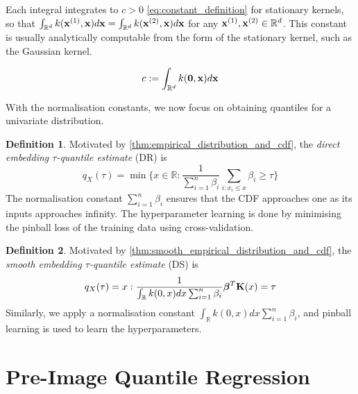 \documentclass[twoside]{article} \usepackage{aistats2017}
\theoremstyle{definition}
\newtheorem{definition}{Definition}[section]
\theoremstyle{theorem}
\newcommand{\rv}[1]{{#1}}
\begin{document}
		Each integral integrates to $c > 0$ \eqref{eq:constant_definition} for stationary kernels, so that $\int_{\mathbb{R}^{d}} k(\mathbf{x}^{(1)}, \mathbf{x}) d\mathbf{x} = \int_{\mathbb{R}^{d}} k(\mathbf{x}^{(2)}, \mathbf{x}) d\mathbf{x}$ for any $\mathbf{x}^{(1)}, \mathbf{x}^{(2)} \in \mathbb{R}^{d}$. This constant is usually analytically computable from the form of the stationary kernel, such as the Gaussian kernel.
		
		\begin{equation}
			c := \int_{\mathbb{R}^{d}} k(\mathbf{0}, \mathbf{x}) d\mathbf{x}
		\label{eq:constant_definition}
		\end{equation}
		
		With the normalisation constants, we now focus on obtaining quantiles for a univariate distribution.

		\theoremstyle{definition}
		\begin{definition}
			Motivated by \cref{thm:empirical_distribution_and_cdf}, the \textit{direct embedding $\tau$-quantile estimate} (DR) is
			\begin{equation}
			q_{\rv{X}}(\tau) = \min\{x \in \mathbb{R} : \frac{1}{\sum_{i = 1}^{n} \beta_{i}} \sum_{i : x_{i} \leq x} \beta_{i} \geq \tau\}
			\end{equation}	
			The normalisation constant $\sum_{i = 1}^{n} \beta_{i}$ ensures that the CDF approaches one as its inputs approaches infinity. The hyperparameter learning is done by minimising the pinball loss of the training data using cross-validation.
		\end{definition}
		
		\theoremstyle{definition}
		\begin{definition}
			Motivated by \cref{thm:smooth_empirical_distribution_and_cdf}, the \textit{smooth embedding $\tau$-quantile estimate} (DS) is
			\begin{equation}
			q_{\rv{X}}(\tau) = x : \frac{1}{\int_{\mathbb{R}} k(0, x) dx \sum_{i = 1}^{n} \beta_{i}} \bm{\beta}^{T} \bvec{K}(x) = \tau
			\end{equation}	
			Similarly, we apply a normalisation constant $\int_{\mathbb{R}} k(0, x) dx \sum_{i = 1}^{n} \beta_{i}$, and pinball learning is used to learn the hyperparameters.
		\end{definition}
	
\section{Pre-Image Quantile Regression}
	\label{sec:pre_image_quantile_regression}
\end{document}

